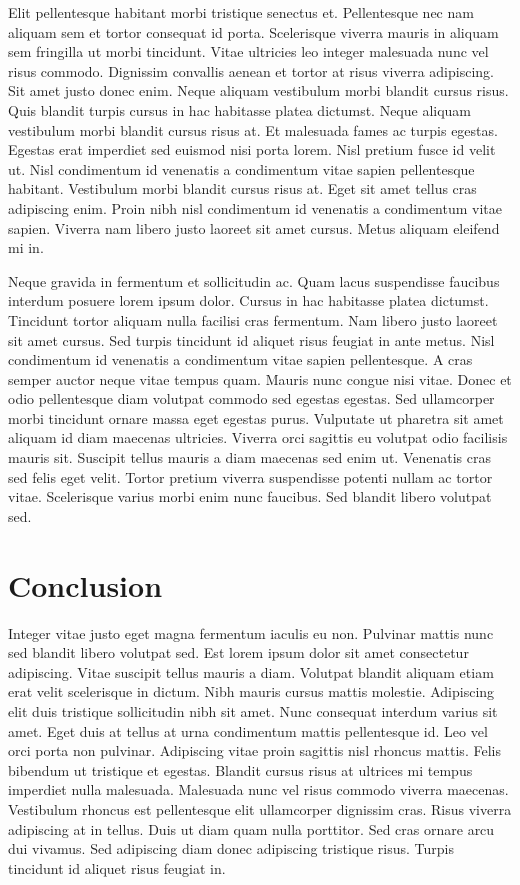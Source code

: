 Elit pellentesque habitant morbi tristique senectus et. Pellentesque nec
nam aliquam sem et tortor consequat id porta. Scelerisque viverra mauris
in aliquam sem fringilla ut morbi tincidunt. Vitae ultricies leo integer
malesuada nunc vel risus commodo. Dignissim convallis aenean et tortor
at risus viverra adipiscing. Sit amet justo donec enim. Neque aliquam
vestibulum morbi blandit cursus risus. Quis blandit turpis cursus in hac
habitasse platea dictumst. Neque aliquam vestibulum morbi blandit cursus
risus at. Et malesuada fames ac turpis egestas. Egestas erat imperdiet
sed euismod nisi porta lorem. Nisl pretium fusce id velit ut. Nisl
condimentum id venenatis a condimentum vitae sapien pellentesque
habitant. Vestibulum morbi blandit cursus risus at. Eget sit amet tellus
cras adipiscing enim. Proin nibh nisl condimentum id venenatis a
condimentum vitae sapien. Viverra nam libero justo laoreet sit amet
cursus. Metus aliquam eleifend mi in.

Neque gravida in fermentum et sollicitudin ac. Quam lacus suspendisse
faucibus interdum posuere lorem ipsum dolor. Cursus in hac habitasse
platea dictumst. Tincidunt tortor aliquam nulla facilisi cras fermentum.
Nam libero justo laoreet sit amet cursus. Sed turpis tincidunt id
aliquet risus feugiat in ante metus. Nisl condimentum id venenatis a
condimentum vitae sapien pellentesque. A cras semper auctor neque vitae
tempus quam. Mauris nunc congue nisi vitae. Donec et odio pellentesque
diam volutpat commodo sed egestas egestas. Sed ullamcorper morbi
tincidunt ornare massa eget egestas purus. Vulputate ut pharetra sit
amet aliquam id diam maecenas ultricies. Viverra orci sagittis eu
volutpat odio facilisis mauris sit. Suscipit tellus mauris a diam
maecenas sed enim ut. Venenatis cras sed felis eget velit. Tortor
pretium viverra suspendisse potenti nullam ac tortor vitae. Scelerisque
varius morbi enim nunc faucibus. Sed blandit libero volutpat sed.

\hypertarget{conclusion}{%
\section{Conclusion}\label{conclusion}}

Integer vitae justo eget magna fermentum iaculis eu non. Pulvinar mattis
nunc sed blandit libero volutpat sed. Est lorem ipsum dolor sit amet
consectetur adipiscing. Vitae suscipit tellus mauris a diam. Volutpat
blandit aliquam etiam erat velit scelerisque in dictum. Nibh mauris
cursus mattis molestie. Adipiscing elit duis tristique sollicitudin nibh
sit amet. Nunc consequat interdum varius sit amet. Eget duis at tellus
at urna condimentum mattis pellentesque id. Leo vel orci porta non
pulvinar. Adipiscing vitae proin sagittis nisl rhoncus mattis. Felis
bibendum ut tristique et egestas. Blandit cursus risus at ultrices mi
tempus imperdiet nulla malesuada. Malesuada nunc vel risus commodo
viverra maecenas. Vestibulum rhoncus est pellentesque elit ullamcorper
dignissim cras. Risus viverra adipiscing at in tellus. Duis ut diam quam
nulla porttitor. Sed cras ornare arcu dui vivamus. Sed adipiscing diam
donec adipiscing tristique risus. Turpis tincidunt id aliquet risus
feugiat in.
